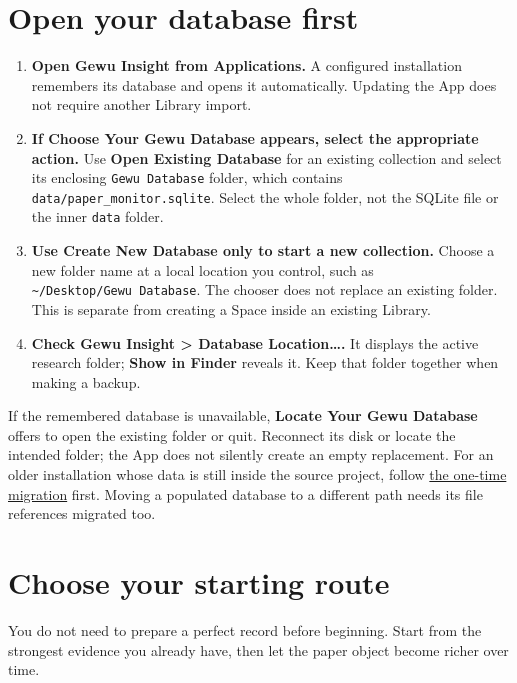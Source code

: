 \documentclass[10pt,letterpaper,oneside]{scrreprt}
\providecommand{\tightlist}{\setlength{\itemsep}{1pt}\setlength{\parskip}{0pt}}
\begin{document}
\section{Open your database first}\label{first-database}

\begin{enumerate}
\tightlist
\item
  \textbf{Open \textbf{Gewu Insight} from Applications.} A configured installation remembers its database and opens it automatically. Updating the App does not require another Library import.
\item
  \textbf{If \textbf{Choose Your Gewu Database} appears, select the appropriate action.} Use \textbf{Open Existing Database} for an existing collection and select its enclosing \texttt{Gewu\ Database} folder, which contains \nolinkurl{data/paper_monitor.sqlite}. Select the whole folder, not the SQLite file or the inner \texttt{data} folder.
\item
  \textbf{Use \textbf{Create New Database} only to start a new collection.} Choose a new folder name at a local location you control, such as \texttt{\textasciitilde{}/Desktop/Gewu\ Database}. The chooser does not replace an existing folder. This is separate from creating a Space inside an existing Library.
\item
  \textbf{Check \textbf{Gewu Insight \textgreater{} Database Location\ldots{}}.} It displays the active research folder; \textbf{Show in Finder} reveals it. Keep that folder together when making a backup.
\end{enumerate}

If the remembered database is unavailable, \textbf{Locate Your Gewu Database} offers to open the existing folder or quit. Reconnect its disk or locate the intended folder; the App does not silently create an empty replacement. For an older installation whose data is still inside the source project, follow \hyperref[source-workspace-migration]{the one-time migration} first. Moving a populated database to a different path needs its file references migrated too.

\section{Choose your starting route}\label{choose-your-starting-route}

You do not need to prepare a perfect record before beginning. Start from the strongest evidence you already have, then let the paper object become richer over time.
\end{document}

